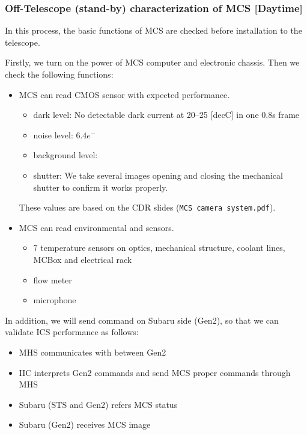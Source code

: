 \subsubsection{Off-Telescope (stand-by) characterization of MCS [Daytime]}\label{secflow:MCSoff}
In this process, the basic functions of MCS are checked before installation to the telescope.

Firstly, we turn on the power of MCS computer and electronic chassis.
Then we check the following functions:

\begin{itemize}
\item MCS can read CMOS sensor with expected performance.
	\begin{itemize}
	\item dark level: No detectable dark current at 20--25 [decC] in one 0.8s frame
	\item noise level: $6.4 e^-$
	\item background level: 
	\item shutter: We take several images opening and closing the mechanical shutter to confirm it works properly.
	\end{itemize}
These values are based on the CDR slides ({\tt MCS camera system.pdf}).
\item MCS can read environmental and sensors.
	\begin{itemize}
	\item 7 temperature sensors on optics, mechanical structure, coolant lines, MCBox and electrical rack 
	\item flow meter
	\item microphone
	\end{itemize}
\end{itemize}

In addition, we will send command on Subaru side (Gen2), so that we can validate ICS performance as follows:
\begin{itemize}
\item MHS communicates with between Gen2
\item IIC interprets Gen2 commands and send MCS proper commands through MHS
\item Subaru (STS and Gen2) refers MCS status 
\item Subaru (Gen2) receives MCS image
\end{itemize}

